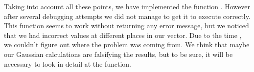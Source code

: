\noindent Taking into account all these points, we have implemented the function . However after several debugging attempts we did not manage to get it to execute correctly. This function seems to work without returning any error message, but we noticed that we had incorrect values at different places in our vector. Due to the time , we couldn't figure out where the problem was coming from. We think that maybe our Gaussian calculations are falsifying the results, but to be sure, it will be necessary to look in detail at the  function.





